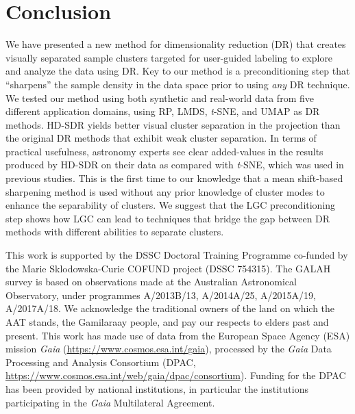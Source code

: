 \documentclass[sagev,Afour,times]{sagej}
\begin{document}
\section{Conclusion}
\label{sec:conclusion}
%
We have presented a new method for dimensionality reduction (DR) that creates visually separated sample clusters targeted for user-guided labeling to explore and analyze the data using DR. Key to our method is a preconditioning step that ``sharpens'' the sample density in the data space prior to using \emph{any} DR technique. We tested our method using both synthetic and real-world data from five different application domains, using RP, LMDS, \emph{t}-SNE, and UMAP as DR methods. HD-SDR yields better visual cluster separation in the projection than the original DR methods that exhibit weak cluster separation. In terms of practical usefulness, astronomy experts see clear added-values in the results produced by HD-SDR on their data as compared with \emph{t}-SNE, which was used in previous studies. This is the first time to our knowledge that a mean shift-based sharpening method is used without any prior knowledge of cluster modes to enhance the separability of clusters. We suggest that the LGC preconditioning step shows how LGC can lead to techniques that bridge the gap between DR methods with different abilities to separate clusters.



\begin{acks}
This work is supported by the DSSC Doctoral Training Programme co-funded by the Marie Sklodowska-Curie COFUND project (DSSC 754315). The GALAH survey is based on observations made at the Australian Astronomical Observatory, under programmes A/2013B/13, A/2014A/25, A/2015A/19, A/2017A/18. We acknowledge the traditional owners of the land on which the AAT stands, the Gamilaraay people, and pay our respects to elders past and present. This work has made use of data from the European Space Agency (ESA) mission \emph{Gaia} (\url{https://www.cosmos.esa.int/gaia}), processed by the \emph{Gaia} Data Processing and Analysis Consortium (DPAC, \url{https://www.cosmos.esa.int/web/gaia/dpac/consortium}). Funding for the DPAC has been provided by national institutions, in particular the institutions participating in the \emph{Gaia} Multilateral Agreement.
\end{acks}




\end{document}

